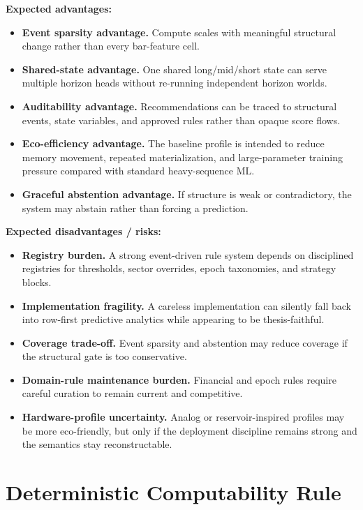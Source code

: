 \textbf{Expected advantages:}
\begin{itemize}
    \item \textbf{Event sparsity advantage.} Compute scales with meaningful structural change rather than every bar-feature cell.
    \item \textbf{Shared-state advantage.} One shared long/mid/short state can serve multiple horizon heads without re-running independent horizon worlds.
    \item \textbf{Auditability advantage.} Recommendations can be traced to structural events, state variables, and approved rules rather than opaque score flows.
    \item \textbf{Eco-efficiency advantage.} The baseline profile is intended to reduce memory movement, repeated materialization, and large-parameter training pressure compared with standard heavy-sequence ML.
    \item \textbf{Graceful abstention advantage.} If structure is weak or contradictory, the system may abstain rather than forcing a prediction.
\end{itemize}

\textbf{Expected disadvantages / risks:}
\begin{itemize}
    \item \textbf{Registry burden.} A strong event-driven rule system depends on disciplined registries for thresholds, sector overrides, epoch taxonomies, and strategy blocks.
    \item \textbf{Implementation fragility.} A careless implementation can silently fall back into row-first predictive analytics while appearing to be thesis-faithful.
    \item \textbf{Coverage trade-off.} Event sparsity and abstention may reduce coverage if the structural gate is too conservative.
    \item \textbf{Domain-rule maintenance burden.} Financial and epoch rules require careful curation to remain current and competitive.
    \item \textbf{Hardware-profile uncertainty.} Analog or reservoir-inspired profiles may be more eco-friendly, but only if the deployment discipline remains strong and the semantics stay reconstructable.
\end{itemize}


\section{Deterministic Computability Rule}

